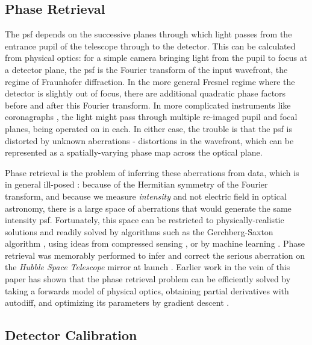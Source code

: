 \documentclass[]{spieman}
\begin{document}
\subsection{Phase Retrieval}
The \ac{psf} depends on the successive planes through which light passes from the entrance pupil of the telescope through to the detector. This can be calculated from physical optics: for a simple camera bringing light from the pupil to focus at a detector plane, the \ac{psf} is the Fourier transform of the input wavefront, the regime of Fraunhofer diffraction. In the more general Fresnel regime where the detector is slightly out of focus, there are additional quadratic phase factors before and after this Fourier transform. In more complicated instruments like coronagraphs \cite{Bowler2016}, the light might pass through multiple re-imaged pupil and focal planes, being operated on in each. In either case, the trouble is that the \ac{psf} is distorted by unknown aberrations - distortions in the wavefront, which can be represented as a spatially-varying phase map across the optical plane. 

Phase retrieval is the problem of inferring these aberrations from data\cite{schechtman2014}, which is in general ill-posed \cite{barnett2020}: because of the Hermitian symmetry of the Fourier transform, and because we measure \textit{intensity} and not electric field in optical astronomy, there is a large space of aberrations that would generate the same intensity \ac{psf}. Fortunately, this space can be restricted to physically-realistic solutions and readily solved by algorithms such as the Gerchberg-Saxton algorithm \cite{gerchberg1972}, using ideas from compressed sensing \cite{candes2011}, or by machine learning \cite{metzler2018,isil2019,nishizaki2020}.  Phase retrieval was memorably performed to infer and correct the serious aberration on the \textit{Hubble Space Telescope} mirror at launch \cite{hubble_phase_ret}. 
Earlier work in the vein of this paper has shown that the phase retrieval problem can be efficiently solved by taking a forwards model of physical optics, obtaining partial derivatives with autodiff, and optimizing its parameters by gradient descent \cite{jurling_fienup,phase_ret_and_design}.

\subsection{Detector Calibration}
\end{document}
